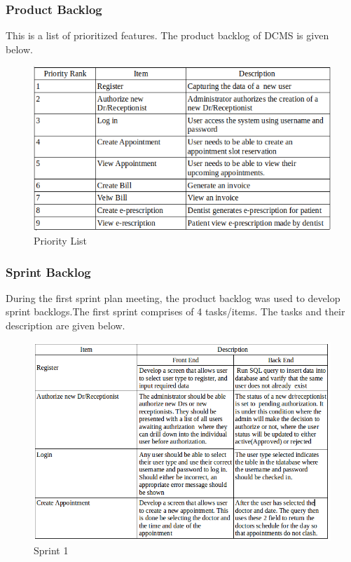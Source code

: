 \documentclass[11 pt]{article}
\begin{document}
\subsubsection{Product Backlog}
This is a list of prioritized features. The product backlog of DCMS is given below.
\begin{figure}[h]
\centering
\includegraphics[width=\linewidth]{PriorityList.png}
\caption{Priority List}
\label{fig:ERD}
\end{figure}
\subsubsection{Sprint Backlog}
During the first sprint plan meeting, the product backlog was used to develop sprint backlogs.The first sprint comprises of 4 tasks/items. The tasks and their description are given below.
\begin{figure}[h]
\centering
\includegraphics[width=\linewidth]{final.png}
\caption{Sprint 1}
\label{fig:ERD}
\end{figure}
\end{document}
